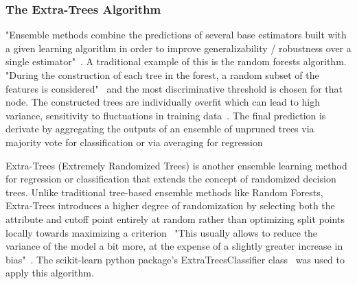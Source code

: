 \documentclass[10pt,sigconf,letterpaper,nonacm]{acmart}
\begin{document}
\subsubsection{The Extra-Trees Algorithm} "Ensemble methods combine the
predictions of several base estimators built with a given learning algorithm in order to
improve generalizability / robustness over a single estimator"~\cite{sklearn111}. A
traditional example of this is the random forests algorithm. "During the construction of
each tree in the forest, a random subset of the features is considered"~\cite{sklearn111}
and the most discriminative threshold is chosen for that node. The constructed trees are
individually overfit which can lead to high variance, sensitivity to fluctuations in
training data~\cite{sklearn111}. The final prediction is derivate by aggregating the
outputs of an ensemble of unpruned trees via majority vote for classification or via
averaging for regression~\cite{Geurts2006}
\par Extra-Trees (Extremely Randomized Trees) is another ensemble learning method for
regression or classification that extends the concept of randomized decision trees.
Unlike traditional tree-based ensemble methods like Random Forests, Extra-Trees
introduces a higher degree of randomization by selecting both the attribute and cutoff
point entirely at random rather than optimizing split points locally towards maximizing a
criterion~\cite{Geurts2006} "This usually allows to reduce the variance of the model a
bit more, at the expense of a slightly greater increase in bias"~\cite{sklearn111}. The
scikit-learn python package's ExtraTreesClassifier class~\cite{sklearn111} was used to apply
this algorithm.
\end{document}
